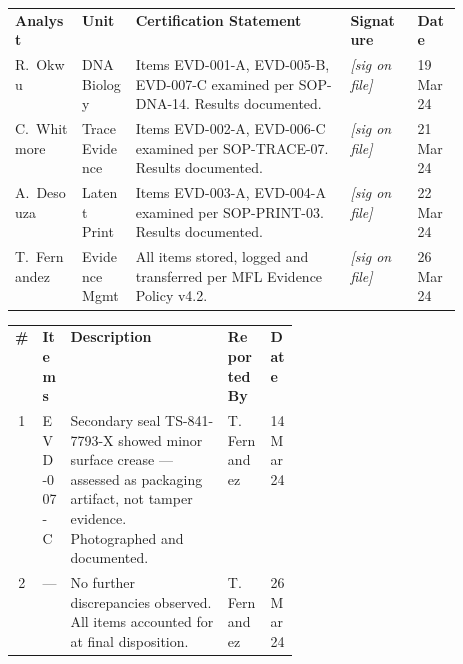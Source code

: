 \documentclass[letterpaper,11pt]{article}
\begin{document}
\vspace{5pt}

\begin{tcolorbox}[sectionbox, title={\faMicroscope\quad ANALYST CERTIFICATIONS}]
\sffamily\small
\setlength{\tabcolsep}{4pt}
\renewcommand{\arraystretch}{1.35}
\begin{tabularx}{\linewidth}{@{}p{0.15\linewidth} p{0.12\linewidth} X p{0.15\linewidth} p{0.10\linewidth}@{}}
  \rowcolor{ForensicBlue}
  \color{white}\bfseries Analyst &
  \color{white}\bfseries Unit &
  \color{white}\bfseries Certification Statement &
  \color{white}\bfseries Signature &
  \color{white}\bfseries Date \\
  \rowcolor{RowAlt}
  R.\ Okwu & DNA Biology &
    Items EVD-001-A, EVD-005-B, EVD-007-C examined per SOP-DNA-14. Results documented. &
    \textit{[sig on file]} & 19 Mar 24 \\
  C.\ Whitmore & Trace Evidence &
    Items EVD-002-A, EVD-006-C examined per SOP-TRACE-07. Results documented. &
    \textit{[sig on file]} & 21 Mar 24 \\
  \rowcolor{RowAlt}
  A.\ Desouza & Latent Print &
    Items EVD-003-A, EVD-004-A examined per SOP-PRINT-03. Results documented. &
    \textit{[sig on file]} & 22 Mar 24 \\
  T.\ Fernandez & Evidence Mgmt &
    All items stored, logged and transferred per MFL Evidence Policy v4.2. &
    \textit{[sig on file]} & 26 Mar 24 \\
\end{tabularx}
\end{tcolorbox}

\vspace{5pt}

\begin{tcolorbox}[sectionbox, title={\faExclamationTriangle\quad DISCREPANCIES, ANOMALIES \& REMARKS}]
\sffamily\small
\renewcommand{\arraystretch}{1.30}
\begin{tabularx}{\linewidth}{@{}c p{0.08\linewidth} X p{0.15\linewidth} p{0.10\linewidth}@{}}
  \rowcolor{ForensicBlue}
  \color{white}\bfseries \# &
  \color{white}\bfseries Items &
  \color{white}\bfseries Description &
  \color{white}\bfseries Reported By &
  \color{white}\bfseries Date \\
  \rowcolor{RowAlt}
  1 & EVD-007-C &
    Secondary seal TS-841-7793-X showed minor surface crease --- assessed as packaging
    artifact, not tamper evidence. Photographed and documented. &
    T.\ Fernandez & 14 Mar 24 \\
  2 & --- &
    No further discrepancies observed. All items accounted for at final disposition. &
    T.\ Fernandez & 26 Mar 24 \\
\end{tabularx}
\end{tcolorbox}
\end{document}
